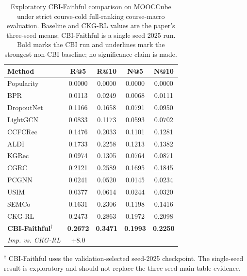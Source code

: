 \begin{table}[t]
\centering
{
\small
\setlength{\tabcolsep}{5.5pt}
\renewcommand{\arraystretch}{0.98}
\begin{tabular*}{\textwidth}{@{\extracolsep{\fill}}lcccc}
\toprule
Method & R@5 & R@10 & N@5 & N@10 \\
\midrule
Popularity & 0.0000 & 0.0000 & 0.0000 & 0.0000 \\
BPR & 0.0113 & 0.0249 & 0.0068 & 0.0111 \\
DropoutNet & 0.1166 & 0.1658 & 0.0791 & 0.0950 \\
LightGCN & 0.0833 & 0.1173 & 0.0593 & 0.0702 \\
CCFCRec & 0.1476 & 0.2033 & 0.1101 & 0.1281 \\
ALDI & 0.1733 & 0.2258 & 0.1213 & 0.1382 \\
KGRec & 0.0974 & 0.1305 & 0.0764 & 0.0871 \\
CGRC & \underline{0.2121} & \underline{0.2589} & \underline{0.1695} & \underline{0.1845} \\
PCGNN & 0.0241 & 0.0520 & 0.0145 & 0.0234 \\
USIM & 0.0377 & 0.0614 & 0.0244 & 0.0320 \\
SEMCo & 0.1631 & 0.2306 & 0.1198 & 0.1416 \\
CKG-RL & 0.2473 & 0.2863 & 0.1972 & 0.2098 \\
\textbf{CBI-Faithful}$^\dagger$ & \textbf{0.2672} & \textbf{0.3471} & \textbf{0.1993} & \textbf{0.2250} \\
\midrule
\emph{Imp. vs. CKG-RL} & +8.0%
\bottomrule
\end{tabular*}
}
\caption{Exploratory CBI-Faithful comparison on MOOCCube under strict course-cold full-ranking course-macro evaluation. Baseline and CKG-RL values are the paper's three-seed means; CBI-Faithful is a single seed 2025 run. Bold marks the CBI run and underlines mark the strongest non-CBI baseline; no significance claim is made.}
\label{tab:cbi-main-table-comparison}
\vspace{2pt}
\parbox{\textwidth}{\footnotesize $^\dagger$ CBI-Faithful uses the validation-selected seed-2025 checkpoint. The single-seed result is exploratory and should not replace the three-seed main-table evidence.}
\end{table}
